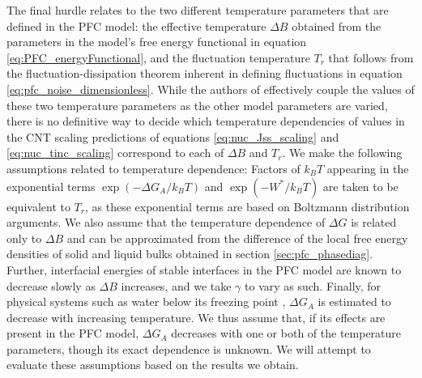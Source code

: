 The final hurdle relates to the two different temperature parameters that are defined in the PFC model: the effective temperature $\Delta B$ obtained from the parameters in the model's free energy functional in equation \ref{eq:PFC_energyFunctional}, and the fluctuation temperature $T_r$ that follows from the fluctuation-dissipation theorem inherent in defining fluctuations in equation \ref{eq:pfc_noise_dimensionless}. While the authors of \cite{kocher16} effectively couple the values of these two temperature parameters as the other model parameters are varied, there is no definitive way to decide which temperature dependencies of values in the CNT scaling predictions of equations \ref{eq:nuc_Jss_scaling} and \ref{eq:nuc_tinc_scaling} correspond to each of $\Delta B$ and $T_r$. We make the following assumptions related to temperature dependence: Factors of $k_B T$ appearing in the exponential terms $\exp(-\Delta G_A/k_B T)$ and $\exp(-W^*/k_B T)$ are taken to be equivalent to $T_r$, as these exponential terms are based on Boltzmann distribution arguments. We also assume that the temperature dependence of $\Delta G$ is related only to $\Delta B$ and can be approximated from the difference of the local free energy densities of solid and liquid bulks obtained in section \ref{sec:pfc_phasediag}. Further, interfacial energies of stable interfaces in the PFC model are known \cite{provatas_coms} to decrease slowly as $\Delta B$ increases, and we take $\gamma$ to vary as such. Finally, for physical systems such as water below its freezing point \cite{jeffery97}, $\Delta G_A$ is estimated to decrease with increasing temperature. We thus assume that, if its effects are present in the PFC model, $\Delta G_A$ decreases with one or both of the temperature parameters, though its exact dependence is unknown. We will attempt to evaluate these assumptions based on the results we obtain.

















